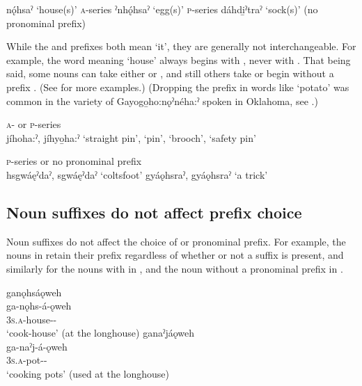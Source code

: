 \ea\label{ex:unpossnounppex}
\ea\label{ex:unpossnounppexa}nǫ́hsaˀ ‘house(s)’ \textsc{a}-series
\ex\label{ex:unpossnounppexb}ˀnhǫ́hsaˀ ‘egg(s)’ \textsc{p}-series
\ex\label{ex:unpossnounppexc}dáhdi̱ˀtraˀ ‘sock(s)’ (no pronominal prefix)
\z
\z

While the  and  prefixes both mean ‘it’, they are generally not interchangeable. For example, the word meaning ‘house’ always begins with , never with . That being said, some nouns can take either  or  , and still others take  or begin without a prefix . (See  for more examples.) (Dropping the  prefix in words like  ‘potato’ was common in the variety of Gayogo̱ho:nǫˀnéha:ˀ spoken in Oklahoma, see .)


\ea\label{ex:unpossnounppex2} \textsc{a}- or \textsc{p}-series\\
jíhoha:ˀ, jíhyo̱ha:ˀ ‘straight pin’, ‘pin’, ‘brooch’, ‘safety pin’
\z

\FloatBarrier
\ea\label{ex:unpossnounppex3} \textsc{p}-series or no pronominal prefix\\
\ea {}hsgwáęˀdaˀ, sgwáęˀdaˀ ‘coltsfoot’
\ex {}gyáǫhsraˀ, gyáǫhsraˀ ‘a trick’ 
\z
\z 



\subsection{Noun suffixes do not affect prefix choice} \label{ch:Noun suffixes do not affect prefix choice}
Noun suffixes do not affect the choice of  or  pronominal prefix. For example, the nouns in  retain their  prefix regardless of whether or not a suffix is present, and similarly for the nouns with  in , and the noun without a pronominal prefix in .

\ea\label{ex:unpossnounppex8}
\ea ganǫhsáǫweh \\
\gll ga-nǫhs-á-ǫweh\\
\textsc{3s.a}-house-{\joinerA}-{\typicalizer}\\
\glt ‘cook-house’ (at the longhouse)
\ex ganaˀjáǫweh \\
\gll ga-naˀj-á-ǫweh\\
\textsc{3s.a}-pot-{\joinerA}-{\typicalizer}\\
\glt ‘cooking pots’ (used at the longhouse) 
\z
\z

